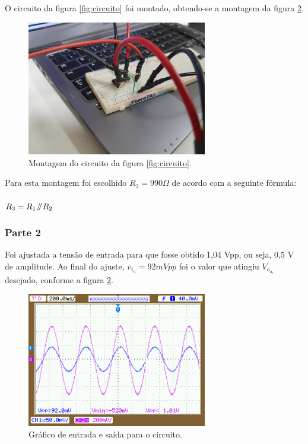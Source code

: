 \documentclass{abntex2}
\newcommand{\parallelsum}{\mathbin{\!/\mkern-5mu/\!}}
\begin{document}
O circuito da figura \ref{fig:circuito} foi montado, obtendo-se a montagem da figura \ref{fig:montagem1}.

\begin{figure}[h]
  \centering
  \includegraphics[width = 0.7\textwidth]{montagem1.jpg}
  \caption{Montagem do circuito da figura \ref{fig:circuito}.}
  \label{fig:montagem1}
\end{figure}
Para esta montagem foi escolhido $R_3 = 990\Omega$ de acordo com a seguinte fórmula: \\\\$R_3 = R_1 \parallelsum R_2$

\subsubsection{Parte 2}

Foi ajustada a tensão de entrada para que fosse obtido 1,04 Vpp, ou seja, 0,5 V de amplitude. Ao final do ajuste, $v_i_n = 92 mVpp$ foi o valor que atingiu $V_o_u_t$ desejado, conforme a figura \ref{fig:montagem1}.
\begin{figure}[h]
  \centering
  \includegraphics[width = 0.7\textwidth]{NewFile13.png}
  \caption{Gráfico de entrada e saída para o circuito.}
  \label{fig:montagem1}
\end{figure}
\end{document}
